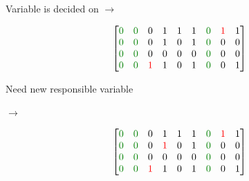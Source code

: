 \documentclass[aspectratio=196]{slides}
\begin{document}
\begin{minipage}{0.2\linewidth}
\centering
Variable is decided on $\rightarrow$
\end{minipage}
\begin{minipage}{0.3\linewidth}
\[
\begin{bmatrix}
\color{darkgreen}0 & \color{darkgreen}0 &           0 & 1 & 1 & 1 & \color{darkgreen}0 & \color{red}1 & 1\\
\color{darkgreen}0 & \color{darkgreen}0 &           0 & 1 & 0 & 1 & \color{darkgreen}0 & 0 & 0\\
\color{darkgreen}0 & \color{darkgreen}0 &           0 & 0 & 0 & 0 & \color{darkgreen}0 & 0 & 0\\
\color{darkgreen}0 & \color{darkgreen}0 &\color{red}1 & 1 & 0 & 1 & \color{darkgreen}0 & 0 & 1\\
\end{bmatrix}
\]
\end{minipage}
%
\begin{minipage}{0.2\linewidth}
\centering
Need new responsible variable

$\rightarrow$
\end{minipage}
%
\begin{minipage}{0.3\linewidth}
\[
\begin{bmatrix}
\color{darkgreen}0 & \color{darkgreen}0 &           0 & 1 & 1 & 1 & \color{darkgreen}0 & \color{red}1 & 1\\
\color{darkgreen}0 & \color{darkgreen}0 &           0 & \color{red}1 & 0 & 1 & \color{darkgreen}0 & 0 & 0\\
\color{darkgreen}0 & \color{darkgreen}0 &           0 & 0 & 0 & 0 & \color{darkgreen}0 & 0 & 0\\
\color{darkgreen}0 & \color{darkgreen}0 &\color{red}1 & 1 & 0 & 1 & \color{darkgreen}0 & 0 & 1\\
\end{bmatrix}
\]
\end{minipage}
\end{document}
